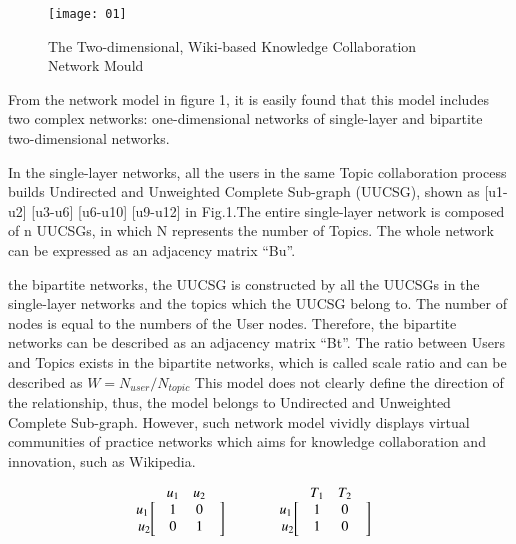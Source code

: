 \documentclass{elsarticle}
\begin{document}
\begin{figure}[h]
  \centering
  \texttt{[image: 01]}
  \caption{The Two-dimensional, Wiki-based Knowledge Collaboration Network Mould}
\end{figure}

From the network model in figure 1, it is easily found that this model
includes two complex networks: one-dimensional networks of
single-layer and bipartite two-dimensional networks. 

In the single-layer networks, all the users in the same Topic collaboration process builds Undirected and Unweighted Complete Sub-graph (UUCSG), shown as [u1-u2] [u3-u6] [u6-u10] [u9-u12] in Fig.1.The entire single-layer network is composed of n UUCSGs, in which N represents the number of Topics. The whole network can be expressed as an adjacency matrix “Bu”.

 the bipartite networks, the UUCSG is constructed by all the UUCSGs in
 the single-layer networks and the topics which the UUCSG belong
 to. The number of nodes is equal to the numbers of the User
 nodes. Therefore, the bipartite networks can be described as an
 adjacency matrix “Bt”. The ratio between Users and Topics exists in
 the bipartite networks, which is called scale ratio and can be
 described as
 \begin{math}
 W = N_{user}/N_{topic}   
 \end{math}
This model does not clearly define the direction of the relationship, thus, the model belongs to Undirected and Unweighted Complete Sub-graph. However, such network model vividly displays virtual communities of practice networks which aims for knowledge collaboration and innovation, such as Wikipedia.



\begin{align*}
  \begin{matrix} 
 &u_1 & u_2 \\  
 u_1\ldelim[{2}{0.1cm}&1&0&\rdelim]{2}{0.1cm}\\
 u_2 &0&1\\
\end{matrix}
& \qquad \qquad 
\begin{matrix}  & T_1 & T_2 \\ 
 u_1\ldelim[{2}{0.1cm}&1&0&\rdelim]{2}{0.1cm}\\
 u_2&1&0 \\
\end{matrix}
\end{align*}
\end{document}
